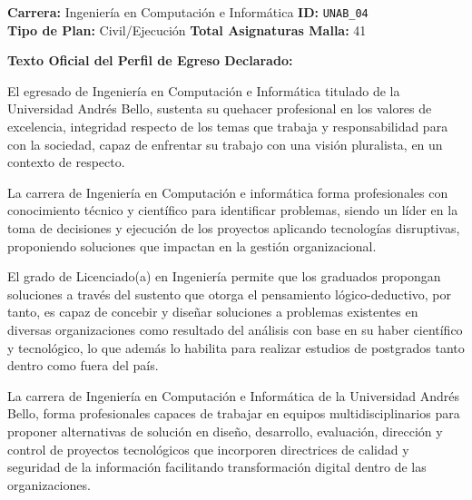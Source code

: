 \documentclass[11pt,a4paper]{article}
\begin{document}
\vspace{10pt}

\begin{tcolorbox}[fichaStyle, title={UNIVERSIDAD 04: Universidad Andrés Bello (UNAB)}]
\small\sffamily
\textbf{Carrera:} Ingeniería en Computación e Informática \hfill \textbf{ID:} \texttt{UNAB\_04} \\
\textbf{Tipo de Plan:} Civil/Ejecución \hfill \textbf{Total Asignaturas Malla:} 41

\tcbline

\textbf{Texto Oficial del Perfil de Egreso Declarado:}\\[4pt]
{\small\rmfamily
El egresado de Ingeniería en Computación e Informática titulado de la Universidad Andrés Bello, sustenta su quehacer profesional en los valores de excelencia, integridad respecto de los temas que trabaja y responsabilidad para con la sociedad, capaz de enfrentar su trabajo con una visión pluralista, en un contexto de respecto.

\vspace{4pt}
La carrera de Ingeniería en Computación e informática forma profesionales con conocimiento técnico y científico para identificar problemas, siendo un líder en la toma de decisiones y ejecución de los proyectos aplicando tecnologías disruptivas, proponiendo soluciones que impactan en la gestión organizacional.

\vspace{4pt}
El grado de Licenciado(a) en Ingeniería permite que los graduados propongan soluciones a través del sustento que otorga el pensamiento lógico-deductivo, por tanto, es capaz de concebir y diseñar soluciones a problemas existentes en diversas organizaciones como resultado del análisis con base en su haber científico y tecnológico, lo que además lo habilita para realizar estudios de postgrados tanto dentro como fuera del país.

\vspace{4pt}
La carrera de Ingeniería en Computación e Informática de la Universidad Andrés Bello, forma profesionales capaces de trabajar en equipos multidisciplinarios para proponer alternativas de solución en diseño, desarrollo, evaluación, dirección y control de proyectos tecnológicos que incorporen directrices de calidad y seguridad de la información facilitando transformación digital dentro de las organizaciones.
}
\end{tcolorbox}

\newpage
\end{document}
